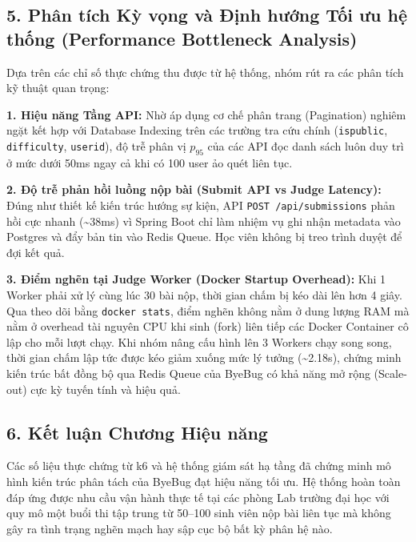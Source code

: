 \documentclass[12pt,a4paper]{article}
\renewcommand{\_}{\BreakableUnderscore}
\begin{document}
\subsection{5. Phân tích Kỳ vọng và Định hướng Tối ưu hệ thống (Performance Bottleneck Analysis)}

Dựa trên các chỉ số thực chứng thu được từ hệ thống, nhóm rút ra các phân tích kỹ thuật quan trọng:

\textbf{1. Hiệu năng Tầng API:} Nhờ áp dụng cơ chế phân trang (Pagination) nghiêm ngặt kết hợp với Database Indexing trên các trường tra cứu chính (\texttt{is\_public}, \texttt{difficulty}, \texttt{user\_id}), độ trễ phân vị \(p_{95}\) của các API đọc danh sách luôn duy trì ở mức dưới 50ms ngay cả khi có 100 user ảo quét liên tục.

\textbf{2. Độ trễ phản hồi luồng nộp bài (Submit API vs Judge Latency):} Đúng như thiết kế kiến trúc hướng sự kiện, API \texttt{POST\ /api/submissions} phản hồi cực nhanh (\textasciitilde38ms) vì Spring Boot chỉ làm nhiệm vụ ghi nhận metadata vào Postgres và đẩy bản tin vào Redis Queue. Học viên không bị treo trình duyệt để đợi kết quả.

\textbf{3. Điểm nghẽn tại Judge Worker (Docker Startup Overhead):} Khi 1 Worker phải xử lý cùng lúc 30 bài nộp, thời gian chấm bị kéo dài lên hơn 4 giây. Qua theo dõi bằng \texttt{docker\ stats}, điểm nghẽn không nằm ở dung lượng RAM mà nằm ở overhead tài nguyên CPU khi sinh (fork) liên tiếp các Docker Container cô lập cho mỗi lượt chạy. Khi nhóm nâng cấu hình lên 3 Workers chạy song song, thời gian chấm lập tức được kéo giảm xuống mức lý tưởng (\textasciitilde2.18s), chứng minh kiến trúc bất đồng bộ qua Redis Queue của ByeBug có khả năng mở rộng (Scale-out) cực kỳ tuyến tính và hiệu quả.

\subsection{6. Kết luận Chương Hiệu năng}

Các số liệu thực chứng từ k6 và hệ thống giám sát hạ tầng đã chứng minh mô hình kiến trúc phân tách của ByeBug đạt hiệu năng tối ưu. Hệ thống hoàn toàn đáp ứng được nhu cầu vận hành thực tế tại các phòng Lab trường đại học với quy mô một buổi thi tập trung từ 50--100 sinh viên nộp bài liên tục mà không gây ra tình trạng nghẽn mạch hay sập cục bộ bất kỳ phân hệ nào.
\end{document}
